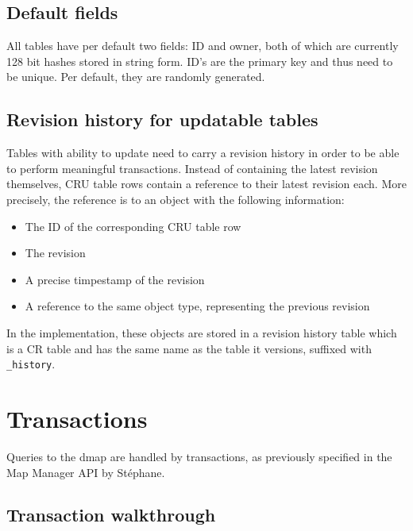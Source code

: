 \documentclass{article}
\begin{document}
\subsection{Default fields}

All tables have per default two fields: ID and owner, both of which are
currently 128 bit hashes stored in string form. ID's are the primary key and
thus need to be unique. Per default, they are randomly generated.

\subsection{Revision history for updatable tables}

Tables with ability to update need to carry a revision history in order to be
able to perform meaningful transactions.
Instead of containing the latest revision themselves, CRU table rows contain
a reference to their latest revision each. More precisely, the reference is to
an object with the following information:

\begin{itemize} \itemsep0em
  \item The ID of the corresponding CRU table row
  \item The revision
  \item A precise timpestamp of the revision
  \item A reference to the same object type, representing the previous revision
\end{itemize}

In the implementation, these objects are stored in a revision history table
which is a CR table and has the same name as the table it versions, suffixed
with {\tt \_history}.

\section{Transactions}\label{transactions}

Queries to the dmap are handled by transactions, as previously specified in
the Map Manager API by Stéphane.

\subsection{Transaction walkthrough}
\end{document}
